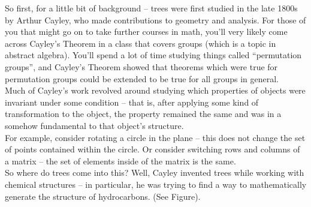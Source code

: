 \documentclass[a4paper,10pt]{report}
\begin{document}
So first, for a little bit of background -- trees were first studied in the late 1800s by Arthur Cayley, who made contributions to geometry and analysis. For those of you that might go on to take further courses in math, you'll very likely come across Cayley's Theorem in a class that covers groups (which is a topic in abstract algebra). You'll spend a lot of time studying things called ``permutation groups'', and Cayley's Theorem showed that theorems which were true for permutation groups could be extended to be true for all groups in general.\\

Much of Cayley's work revolved around studying which properties of objects were invariant under some condition -- that is, after applying some kind of transformation to the object, the property remained the same and was in a somehow fundamental to that object's structure.\\

For example, consider rotating a circle in the plane -- this does not change the set of points contained within the circle. Or consider switching rows and columns of a matrix -- the set of elements inside of the matrix is the same.\\

So where do trees come into this? Well, Cayley invented trees while working with chemical structures -- in particular, he was trying to find a way to mathematically generate the structure of hydrocarbons. (See Figure).\\
\end{document}
